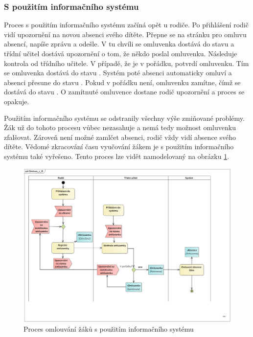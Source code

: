 \subsubsection*{S použitím informačního systému}
Proces s použitím informačního systému začíná opět u rodiče. Po přihlášení rodič vidí upozornění na novou absenci svého dítěte. Přepne se na stránku pro omluvu absencí, napíše zprávu a odešle. V tu chvíli se omluvenka dostává do stavu  a třídní učitel dostává upozornění o tom, že někdo poslal omluvenku. Následuje kontrola od třídního učitele. V případě, že je v pořádku, potvrdí omluvenku. Tím se omluvenka dostává do stavu . Systém poté absenci automaticky omluví a absenci přesune do stavu . Pokud v pořádku není, omluvenku zamítne, čímž se dostává do stavu . O zamítnuté omluvence dostane rodič upozornění a proces se opakuje.

Použitím informačního systému se odstranily všechny výše zmiňované problémy. Žák už do tohoto procesu vůbec nezasahuje a nemá tedy možnost omluvenku zfalšovat. Zároveň není možné zamlčet absenci, rodič vždy vidí absence svého dítěte. Vědomé zkracování času vyučování žákem je s použitím informačního systému také vyřešeno.
Tento proces lze vidět namodelovaný na obrázku \ref{omluva_s_IS}.
\clearpage

\begin{figure}[H]
	\centering
	\includegraphics[width=\textwidth]{images/Omluva_s_IS.png}
	\caption{Proces omlouvání žáků s použitím informačního systému}
	\label{omluva_s_IS}
\end{figure}


